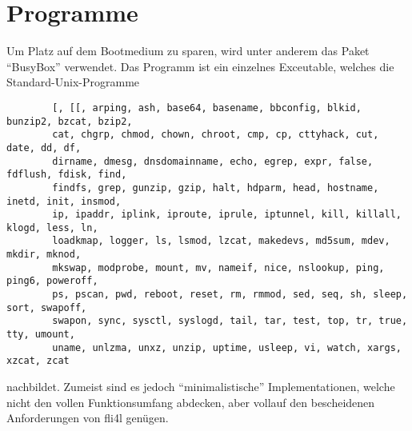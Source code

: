 


    \section{Programme}

    Um Platz auf dem Bootmedium zu sparen, wird unter anderem das Paket
    ``BusyBox'' verwendet. Das Programm ist ein einzelnes Exceutable,
    welches die Standard-Unix-Programme

\begin{example}
\begin{verbatim}
        [, [[, arping, ash, base64, basename, bbconfig, blkid, bunzip2, bzcat, bzip2,
        cat, chgrp, chmod, chown, chroot, cmp, cp, cttyhack, cut, date, dd, df,
        dirname, dmesg, dnsdomainname, echo, egrep, expr, false, fdflush, fdisk, find,
        findfs, grep, gunzip, gzip, halt, hdparm, head, hostname, inetd, init, insmod,
        ip, ipaddr, iplink, iproute, iprule, iptunnel, kill, killall, klogd, less, ln,
        loadkmap, logger, ls, lsmod, lzcat, makedevs, md5sum, mdev, mkdir, mknod,
        mkswap, modprobe, mount, mv, nameif, nice, nslookup, ping, ping6, poweroff,
        ps, pscan, pwd, reboot, reset, rm, rmmod, sed, seq, sh, sleep, sort, swapoff,
        swapon, sync, sysctl, syslogd, tail, tar, test, top, tr, true, tty, umount,
        uname, unlzma, unxz, unzip, uptime, usleep, vi, watch, xargs, xzcat, zcat
\end{verbatim}
\end{example}

    \noindent nachbildet. Zumeist sind es jedoch ``minimalistische''
    Implementationen, welche nicht den vollen Funktionsumfang
    abdecken, aber vollauf den bescheidenen Anforderungen von fli4l
    genügen.

